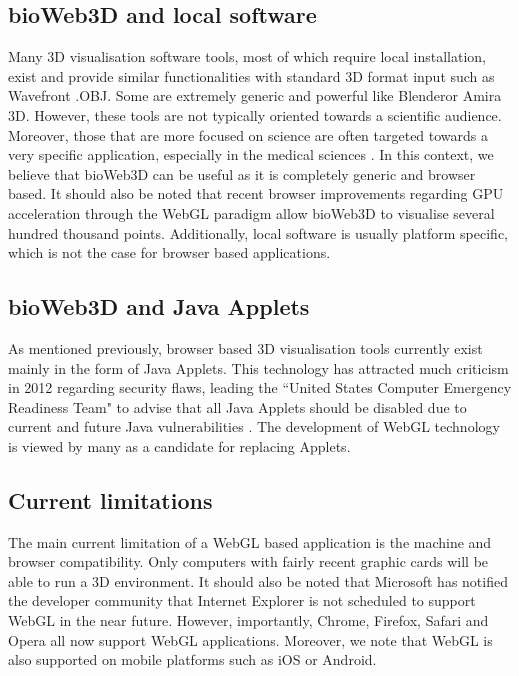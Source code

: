 \documentclass[10pt]{bmc_article}
\newenvironment{bmcformat}{\baselineskip20pt\sloppy\setboolean{publ}{false}}{\baselineskip20pt\sloppy}
\begin{document}
\begin{bmcformat}
	\subsection{bioWeb3D and local software}
Many 3D visualisation software tools, most of which require local installation, exist and provide similar functionalities with standard 3D format input such as Wavefront .OBJ. Some are extremely generic and powerful like Blenderor Amira 3D. However, these tools are not typically oriented towards a scientific audience. Moreover, those that are more focused on science are often targeted towards a very specific application, especially in the medical sciences \cite{Wang09}. In this context, we believe that bioWeb3D can be useful as it is completely generic and browser based. It should also be noted that recent browser improvements regarding GPU acceleration through the WebGL paradigm allow bioWeb3D to visualise several hundred thousand points. Additionally, local software is usually platform specific, which is not the case for browser based applications.

	\subsection{bioWeb3D and Java Applets}
As mentioned previously, browser based 3D visualisation tools currently exist mainly in the form of Java Applets. This technology has attracted much criticism in 2012 regarding security flaws, leading the ``United States Computer Emergency Readiness Team" to advise that all Java Applets should be disabled due to current and future Java vulnerabilities \cite{security}. The development of WebGL technology is viewed by many as a candidate for replacing Applets. 



	\subsection{Current limitations}
The main current limitation of a WebGL based application is the machine and browser compatibility. Only computers with fairly recent graphic cards will be able to run a 3D environment. It should also be noted that Microsoft has notified the developer community that Internet Explorer is not scheduled to support WebGL in the near future. However, importantly, Chrome, Firefox, Safari and Opera all now support WebGL applications. Moreover, we note that WebGL is also supported on mobile platforms such as iOS or Android. \cite{caniuse}



\end{bmcformat}
\end{document}
